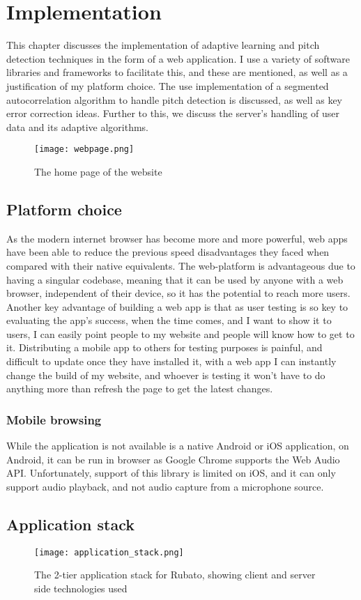 \chapter{Implementation}
This chapter discusses the implementation of adaptive learning and pitch detection techniques in the form of a web application. I use a variety of software libraries and frameworks to facilitate this, and these are mentioned, as well as a justification of my platform choice. The use implementation of a segmented autocorrelation algorithm to handle pitch detection is discussed, as well as key error correction ideas. Further to this, we discuss the server's handling of user data and its adaptive algorithms.
	\begin{figure}[h]
	\centering
	\texttt{[image: webpage.png]}
	\caption{The home page of the website}
\end{figure}
	\section{Platform choice}
	As the modern internet browser has become more and more powerful, web apps have been able to reduce the previous speed disadvantages they faced when compared with their native equivalents. The web-platform is advantageous due to having a singular codebase, meaning that it can be used by anyone with a web browser, independent of their device, so it has the potential to reach more users. Another key advantage of building a web app is that as user testing is so key to evaluating the app's success, when the time comes, and I want to show it to users, I can easily point people to my website and people will know how to get to it. Distributing a mobile app to others for testing purposes is painful, and difficult to update once they have installed it, with a web app I can instantly change the build of my website, and whoever is testing it won't have to do anything more than refresh the page to get the latest changes.
	\subsection{Mobile browsing}
	While the application is not available is a native Android or iOS application, on Android, it can be run in browser as Google Chrome supports the Web Audio API. Unfortunately, support of this library is limited on iOS, and it can only support audio playback, and not audio capture from a microphone source.
	
	\section{Application stack}
	\begin{figure}[h]
		\centering
		\texttt{[image: application\_stack.png]}
		\caption{The 2-tier application stack for Rubato, showing client and server side technologies used}
	\end{figure}
